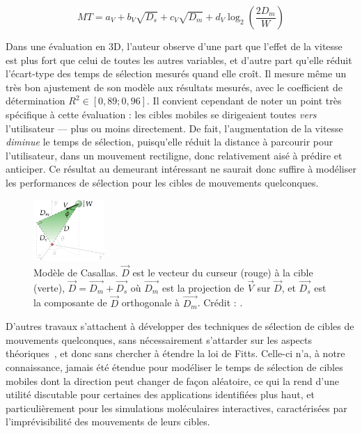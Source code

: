 	\begin{equation}
		\label{eq:casallas}
		MT = a_{V} + b_{V}\sqrt{D_{s}} +  c_{V}\sqrt{D_{m}} + d_{V} \log_{2} \left( \frac{2D_{m}}{W} \right)
	\end{equation}
	
	Dans une évaluation en 3D, l'auteur observe d'une part que l'effet de la vitesse est plus fort que celui de toutes les autres variables, et d'autre part qu'elle réduit l'écart-type des temps de sélection mesurés quand elle croît. Il mesure même un très bon ajustement de son modèle aux résultats mesurés, avec le coefficient de détermination $R^{2} \in [0,89 ; 0,96]$. Il convient cependant de noter un point très spécifique à cette évaluation : les cibles mobiles se dirigeaient toutes \emph{vers} l'utilisateur --- plus ou moins directement. De fait, l'augmentation de la vitesse \emph{diminue} le temps de sélection, puisqu'elle réduit la distance à parcourir pour l'utilisateur, dans un mouvement rectiligne, donc relativement aisé à prédire et anticiper. Ce résultat au demeurant intéressant ne saurait donc suffire à modéliser les performances de sélection pour les cibles de mouvements quelconques.
	
	\begin{figure}
		\centering
		\includegraphics[width=0.24\textwidth]{figures/ch2/casallas}
		\caption[Paramètres du modèle de Casallas]{Modèle de Casallas. $\vec{D}$ est le vecteur du curseur (rouge) à la cible (verte), $\vec{D} = \vec{D_{m}} + \vec{D_{s}}$ où $\vec{D_{m}}$ est la projection de $\vec{V}$ sur $\vec{D}$, et $\vec{D_{s}}$ est la composante de $\vec{D}$ orthogonale à $\vec{D_{m}}$. Crédit : \cite{casallas2015prediction}.}
		\label{fig:casallas}
	\end{figure}
	
	D'autres travaux s'attachent à développer des techniques de sélection de cibles de mouvements quelconques, sans nécessairement s'attarder sur les aspects théoriques~\cite{hasan2011comet, ortega2013hook}, et donc sans chercher à étendre la loi de Fitts. Celle-ci n'a, à notre connaissance, jamais été étendue pour modéliser le temps de sélection de cibles mobiles dont la direction peut changer de façon aléatoire, ce qui la rend d'une utilité discutable pour certaines des applications identifiées plus haut, et particulièrement pour les simulations moléculaires interactives, caractérisées par l'imprévisibilité des mouvements de leurs cibles.
	
